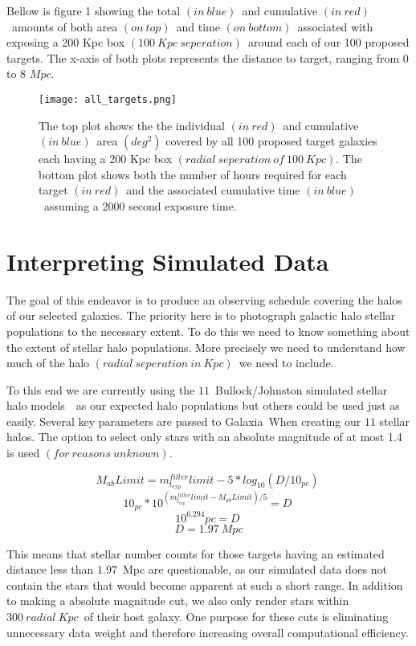 \documentclass[11pt,a4paper,fleqn,notitlepage,oneside]{article}
\begin{document}
	Bellow is figure 1 showing the total $(in\ blue)$\ and cumulative $(in\ red)$\ amounts of both area $(on\ top)$\ and time $(on\ bottom)$\ associated with exposing a 200 Kpc box $(100\ Kpc\ seperation)$\ around each of our 100 proposed targets.
	The x-axis of both plots represents the distance to target, ranging from 0 to 8 $Mpc$.

	\begin{figure}[H]
		\texttt{[image: all\_targets.png]}
	\caption{
		The top plot shows the the individual $(in\ red)$\ and cumulative $(in\ blue)$\ area $(deg^{2})$ covered by all 100 proposed target galaxies each having a 200 Kpc box $(radial\ seperation\ of\ 100\ Kpc)$.
		The bottom plot shows both the number of hours required for each target $(in\ red)$\ and the associated cumulative time $(in\ blue)$\ assuming a 2000 second exposure time.
	}
	\label{fig:all_targets}
	\end{figure}
	

\section{Interpreting Simulated Data} %
	\label{sec:interpreting_simulated_data}
	The goal of this endeavor is to produce an observing schedule covering the halos of our selected galaxies.
	The priority here is to photograph galactic halo stellar populations to the necessary extent.
	To do this we need to know something about the extent of stellar halo populations.
	More precisely we need to understand how much of the halo $(radial\ seperation\ in\ Kpc)$\ we need to include.

	To this end we are currently using the $11$\ Bullock/Johnston simulated stellar halo models~\cite{2005ApJ...635..931B}\cite{2005ApJ...632..872R}\cite{2006ApJ...638..585F}\ as our expected halo populations but others could be used just as easily.
	Several key parameters are passed to Galaxia\cite{Sharma:2011:Online}\ When creating our $11$ stellar halos.
	The option to select only stars with an absolute magnitude of at most 1.4 is used $(for\ reasons\ unknown)$.
	
	\[
	M_{ab}Limit = m^{filter}_{t_{exp}}limit - 5 * log_{10}(D/10_{pc})\
	\]
	\[
	10_{pc}*10^{(m^{filter}_{t_{exp}}limit - M_{ab}Limit)/5} = D\
	\]
	\[
	10^{6.294}pc = D\
	\]
	\[
	D = 1.97\ Mpc
	\]

	This means that stellar number counts for those targets having an estimated distance less than $1.97$\ Mpc are questionable, as our simulated data does not contain the stars that would become apparent at such a short range.
	In addition to making a absolute magnitude cut, we also only render stars within $300\ radial\ Kpc$\ of their host galaxy.
	One purpose for these cuts is eliminating unnecessary data weight and therefore increasing overall computational efficiency.
\end{document}
